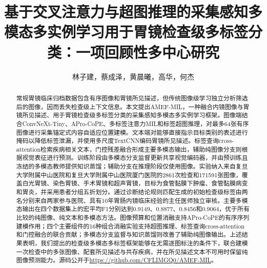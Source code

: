 \documentclass[Afour,sagev,times]{sagej}
\makeatletter
\def\corrauth#1{\gdef\@corrauth{%
  \footnotetext[0]{\par\vskip-3pt\sagesf\noindent\textbf{通讯作者：}\\ #1}}}
\def\email#1{%
  \gdef\@email{\footnotetext[0]{\sagesf 电子邮箱：#1}}}
\makeatother
\begin{document}

\title{基于交叉注意力与超图推理的采集感知多模态多实例学习用于胃镜检查级多标签分类：一项回顾性多中心研究}

\author{林子建，蔡成泽，黄晨曦，高华，何杰}


\corrauth{高华和何杰，复旦大学附属中山医院厦门医院内镜中心，中国福建厦门市湖里区金湖路668号，361015。}

\email{208908636@qq.com; gao.hua@zsxmhospital.com; he.jie@zsxmhospital.com}

\begin{abstract}
常规胃镜临床归档数据包含有序图像和胃镜所见描述，但传统图像级学习独立分析筛选后的图像，因而丢失检查级上下文信息。本文提出AMEF-MIL，一种融合内镜图像与胃镜所见描述、用于胃镜检查级多标签分类的采集感知多模态多实例学习框架。图像端结合ConvNeXt-Tiny、APro-CoPE、多标签注意力MIL和标签超图推理，对最多64张有序图像进行采集锚定式内容自适应位置建模。文本端对能够直接指示目标类别的表述进行掩码以降低标签泄漏，并使用多尺度TextCNN编码胃镜所见描述。标签查询cross-attention检索疾病相关文本，门控残差融合形成主要多模态输出，辅助纯图像分支则根据视觉表征进行预测。训练阶段由多模态分支监督更新共享视觉编码器，并由预训练且冻结的多模态教师提供知识蒸馏；辅助分支在推理阶段仅使用图像。实验纳入来自复旦大学附属中山医院和复旦大学附属中山医院厦门医院的2861次检查和171591张图像，覆盖白光胃镜、染色胃镜、手术胃镜和超声胃镜，目标为食管黏膜下肿瘤、食管黏膜病变和胃炎，并采用患者分组五折划分。通过诊断结论规则匹配生成的初始检查级标签由两名分别来自两家参与医院、具有10年胃肠内镜临床经验的主任医师独立审核。主要多模态输出在四个数据集上的宏平均F1分别达到0.9149、0.8877、0.8456和0.9064，优于所有比较的纯图像、纯文本和多模态方法。图像预算和位置消融支持APro-CoPE的有序序列建模作用；四个主要组件的16种组合消融实验支持超图推理、标签查询cross-attention和门控融合的联合贡献；多模态分支监督与知识蒸馏则改善了辅助纯图像输出。上述结果表明，我们提出的检查级多模态多标签框架能够在无需逐图标注的条件下，联合建模一次检查中的多张图像、配套所见描述与共存疾病，并在所见描述文本不可用时保留纯图像预测能力。源码公开于\url{https://github.com/CFLIMGQ0/AMEF-MIL}。
\end{abstract}
\end{document}
